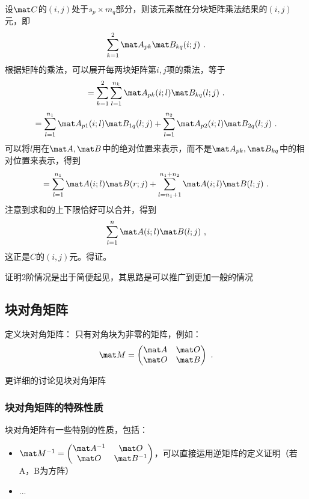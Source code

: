 设$\mat C$的$(i,j)$处于$s_p\times{m_q}$部分，则该元素就在分块矩阵乘法结果的$(i,j)$元，即
\[\sum_{k=1}^{2}\mat A_{pk}\mat B_{kq}(i;j)~.\]
根据矩阵的乘法，可以展开每两块矩阵第$i,j$项的乘法，等于
\[=\sum_{k=1}^{2}\sum_{l=1}^{n_k}\mat A_{pk}(i;l)\mat B_{kq}(l;j)~.\]
\[=\sum_{l=1}^{n_1}\mat A_{p1}(i;l)\mat B_{1q}(l;j)+\sum_{l=1}^{n_2}\mat A_{p2}(i;l)\mat B_{2q}(l;j)~.\]
可以将$l$用在$\mat A,\mat B$中的绝对位置来表示，而不是$\mat A_{pk},\mat B_{kq}$中的相对位置来表示，得到
\[=\sum_{l=1}^{n_1}\mat A(i;l)\mat B(r;j)+\sum_{l=n_1+1}^{n_1+n_2}\mat A(i;l)\mat B(l;j)~.\]
注意到求和的上下限恰好可以合并，得到
\[\sum_{l=1}^{n}\mat A(i;l)\mat B(l;j)~,\]
这正是$C$的$(i,j)$元。得证。

证明2阶情况是出于简便起见，其思路是可以推广到更加一般的情况

\subsection{块对角矩阵}
定义块对角矩阵： 只有对角块为非零的矩阵，例如：
\begin{equation}
\mat M = 
\begin{pmatrix}
\mat A & \mat O\\
\mat O & \mat B\\
\end{pmatrix}~.
\end{equation}

更详细的讨论见块对角矩阵


\subsubsection{块对角矩阵的特殊性质}
块对角矩阵有一些特别的性质，包括：
\begin{itemize}
\item $\mat M ^ {-1} = 
\begin{pmatrix}
\mat A^{-1} & \mat O\\
\mat O & \mat B^{-1}\\
\end{pmatrix}
$，可以直接运用逆矩阵的定义证明（若A，B为方阵）
\item ...
\end{itemize}




